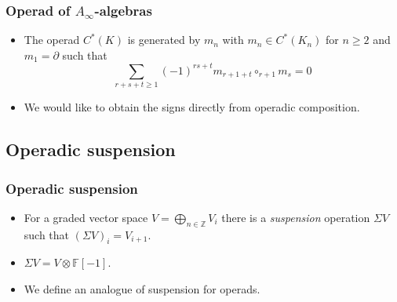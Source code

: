 \documentclass{beamer}
\theoremstyle{definition}
\newcommand{\Z}{\mathbb{Z}}
\begin{document}
\begin{frame}
\frametitle{Operad of $A_\infty$-algebras}
\begin{itemize}
\item<1-> The operad $C^*(K)$ is generated by $m_n$ with $m_n\in C^*(K_n)$ for $n\geq 2$ and $m_1=\partial$ such that 
\[\sum_{r+s+t\geq 1}(-1)^{rs+t}m_{r+1+t}\circ_{r+1}m_s=0\]

\item<2-> We would like to obtain the signs directly from operadic composition.
\end{itemize}
\end{frame}
\subsection{Operadic suspension}
\begin{frame}
\frametitle{Operadic suspension}
\begin{itemize}
\item<1-> For a graded vector space $V=\bigoplus_{n\in\Z} V_i$ there is a \emph{suspension} operation $\Sigma V$ such that $(\Sigma V)_i=V_{i+1}$. \item<2-> $\Sigma V=V\otimes \mathbb{F}[-1]$.
\item<3-> We define an analogue of suspension for operads.
\end{itemize}
\end{frame}
\end{document}
